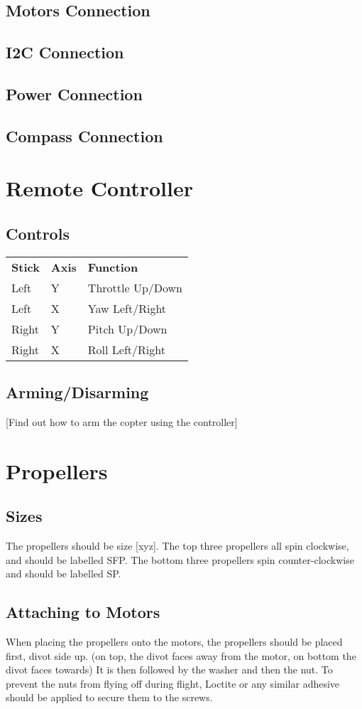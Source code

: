 \documentclass{style}
\begin{document}
\subsection{Motors Connection}
\subsection{I2C Connection}
\subsection{Power Connection}
\subsection{Compass Connection}
\section{Remote Controller}
\subsection{Controls}
\begin{tabular}{ l l l }
  \textbf{Stick} & \textbf{Axis} & \textbf{Function} \\
  Left & Y & Throttle Up/Down \\
  Left & X & Yaw Left/Right \\
  Right & Y & Pitch Up/Down \\
  Right & X & Roll Left/Right
\end{tabular}
\subsection{Arming/Disarming}
[Find out how to arm the copter using the controller]
\section{Propellers}
\subsection{Sizes}
The propellers should be size [xyz].  The top three propellers all spin clockwise, and should be labelled SFP.  The bottom three propellers spin counter-clockwise and should be labelled SP.
\subsection{Attaching to Motors}
When placing the propellers onto the motors, the propellers should be placed first, divot side up. (on top, the divot faces away from the motor, on bottom the divot faces towards)
It is then followed by the washer and then the nut.
To prevent the nuts from flying off during flight, Loctite or any similar adhesive should be applied to secure them to the screws.
\end{document}
